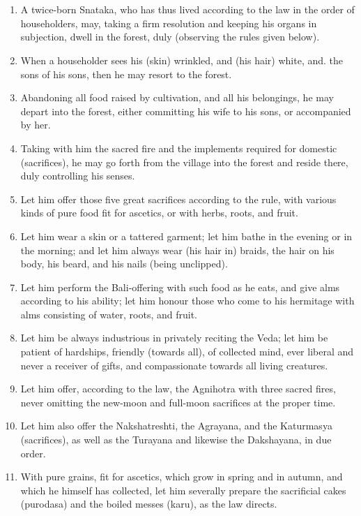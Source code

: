 \chapter{}
\begin{enumerate}
\item A twice-born Snataka, who has thus lived according to the law in the order of householders, may, taking a firm resolution and keeping his organs in subjection, dwell in the forest, duly (observing the rules given below).
\item When a householder sees his (skin) wrinkled, and (his hair) white, and. the sons of his sons, then he may resort to the forest.
\item Abandoning all food raised by cultivation, and all his belongings, he may depart into the forest, either committing his wife to his sons, or accompanied by her.
\item Taking with him the sacred fire and the implements required for domestic (sacrifices), he may go forth from the village into the forest and reside there, duly controlling his senses.
\item Let him offer those five great sacrifices according to the rule, with various kinds of pure food fit for ascetics, or with herbs, roots, and fruit.
\item Let him wear a skin or a tattered garment; let him bathe in the evening or in the morning; and let him always wear (his hair in) braids, the hair on his body, his beard, and his nails (being unclipped).
\item Let him perform the Bali-offering with such food as he eats, and give alms according to his ability; let him honour those who come to his hermitage with alms consisting of water, roots, and fruit.
\item Let him be always industrious in privately reciting the Veda; let him be patient of hardships, friendly (towards all), of collected mind, ever liberal and never a receiver of gifts, and compassionate towards all living creatures.
\item Let him offer, according to the law, the Agnihotra with three sacred fires, never omitting the new-moon and full-moon sacrifices at the proper time.
\item Let him also offer the Nakshatreshti, the Agrayana, and the Katurmasya (sacrifices), as well as the Turayana and likewise the Dakshayana, in due order.
\item With pure grains, fit for ascetics, which grow in spring and in autumn, and which he himself has collected, let him severally prepare the sacrificial cakes (purodasa) and the boiled messes (karu), as the law directs.

\end{enumerate}
